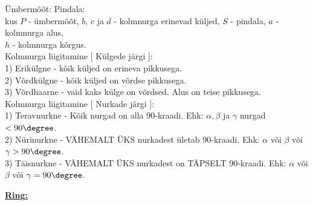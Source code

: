 \begin{center}
{{{\begin{flushleft}
\hspace{5mm} Ümbermõõt:  \hspace{5mm} Pindala: \\
\vspace{2mm}
\hspace{5mm} kus $P$ - ümbermõõt, $b$, $c$ ja $d$ - kolmnurga erinevad küljed, $S$ - pindala, $a$ - kolmnurga alus, \\
\hspace{5mm} $h$ - kolmnurga kõrgus.\\
\vspace{5mm}
\hspace{5mm} Kolmnurga liigitamine [ Külgede järgi ]:\\
\vspace{2mm}
\hspace{5mm} 1) Erikülgne - kõik küljed on erineva pikkusega.\\
\vspace{2mm}
\hspace{5mm} 2) Võrdkülgne - kõik küljed on võrdse pikkusega.\\
\vspace{2mm}
\hspace{5mm} 3) Võrdhaarne - vaid kaks külge on võrdsed. Alus on teise pikkusega.\\
\vspace{5mm}
\hspace{5mm} Kolmnurga liigitamine [ Nurkade järgi ]:\\
\vspace{2mm} 
\hspace{5mm} 1) Teravnurkne - Kõik nurgad on alla 90-kraadi. Ehk: $\alpha ,\beta$ ja $\gamma$ nurgad $< 90\degree$.\\
\vspace{2mm}
\hspace{5mm} 2) Nürinurkne - VÄHEMALT ÜKS nurkadest ületab 90-kraadi. Ehk: $\alpha$ või $\beta$ või $\gamma > 90\degree$.\\
\vspace{2mm}
\hspace{5mm} 3) Täisnurkne - VÄHEMALT ÜKS nurkadest on TÄPSELT 90-kraadi. Ehk: $\alpha$ või $\beta$ või $\gamma = 90\degree$.\\
\vspace{5mm}

\hspace{5mm} \textbf{\underline{Ring:}}
\vspace{5mm}


\end{flushleft}}}}
\end{center}
